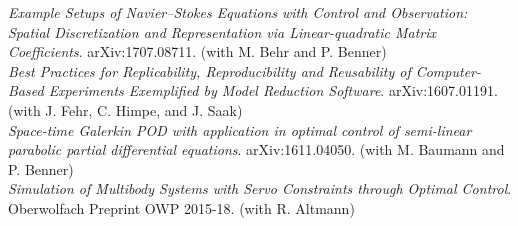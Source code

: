  \emph{Example Setups of Navier--Stokes Equations with Control and Observation: Spatial Discretization and Representation via Linear-quadratic Matrix Coefficients}. arXiv:1707.08711. (with M. Behr and P. Benner) \\

 \emph{Best Practices for Replicability, Reproducibility and Reusability of Computer-Based Experiments Exemplified by Model Reduction Software}. arXiv:1607.01191. (with J. Fehr, C. Himpe, and J. Saak)\\

 \emph{Space-time Galerkin POD with application in optimal control of semi-linear parabolic partial differential equations}. arXiv:1611.04050. (with M. Baumann and P. Benner) \\

 \emph{Simulation of Multibody Systems with Servo Constraints through Optimal Control}. Oberwolfach Preprint OWP 2015-18. (with R. Altmann)


